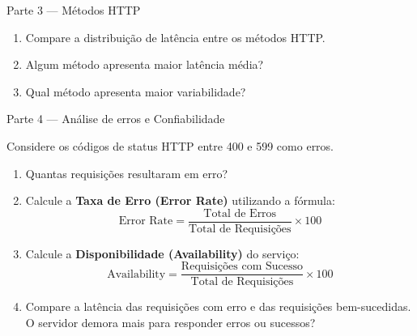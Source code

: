\documentclass[12pt]{article}
\begin{document}
\begin{block}{Parte 3 — Métodos HTTP}

\begin{enumerate}
\item Compare a distribuição de latência entre os métodos HTTP.
\item Algum método apresenta maior latência média?
\item Qual método apresenta maior variabilidade?
\end{enumerate}

\vspace{3cm}

\end{block}

\begin{block}{Parte 4 — Análise de erros e Confiabilidade}

Considere os códigos de status HTTP entre 400 e 599 como erros.

\begin{enumerate}
\item Quantas requisições resultaram em erro?
\item Calcule a \textbf{Taxa de Erro (Error Rate)} utilizando a fórmula:
\[ \text{Error Rate} = \frac{\text{Total de Erros}}{\text{Total de Requisições}} \times 100 \]
\item Calcule a \textbf{Disponibilidade (Availability)} do serviço:
\[ \text{Availability} = \frac{\text{Requisições com Sucesso}}{\text{Total de Requisições}} \times 100 \]
\item Compare a latência das requisições com erro e das requisições bem-sucedidas. O servidor demora mais para responder erros ou sucessos?
\end{enumerate}

\vspace{1cm}

\end{block}
\end{document}
